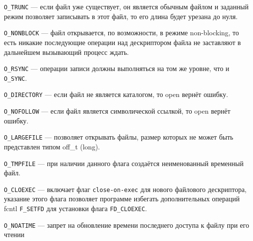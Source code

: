 \texttt{O\_TRUNC} --- если файл уже существует, он является обычным файлом и заданный режим позволяет записывать в этот файл, то его длина будет урезана до нуля.

\texttt{O\_NONBLOCK} --- файл открывается, по возможности, в режиме non-blocking, то есть никакие последующие операции над дескриптором файла не заставляют в дальнейшем вызывающий процесс ждать.

\texttt{O\_RSYNC} --- операции записи должны выполняться на том же уровне, что и \texttt{O\_SYNC}.

\texttt{O\_DIRECTORY} --- если файл не является каталогом, то open вернёт ошибку.

\texttt{O\_NOFOLLOW} --- если файл является символической ссылкой, то open вернёт ошибку.

\texttt{O\_LARGEFILE} --- позволяет открывать файлы, размер которых не может быть представлен типом off\_t (long).

\texttt{O\_TMPFILE} --- при наличии данного флага создаётся неименованный временный файл.

\texttt{O\_CLOEXEC} --- включает флаг \texttt{close-on-exec} для нового файлового дескриптора, указание этого флага позволяет программе избегать дополнительных операций fcntl \texttt{F\_SETFD} для установки флага \texttt{FD\_CLOEXEC}.

\texttt{O\_NOATIME} --- запрет на обновление времени последнего доступа к файлу при его чтении

